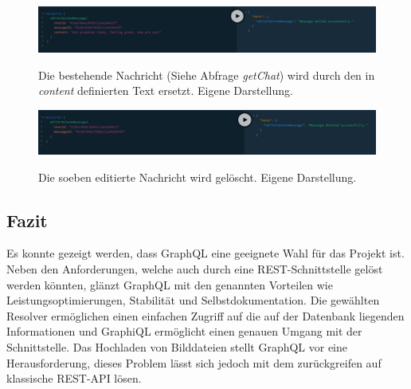 \begin{figure}
	\centering
    \includegraphics[width=\textwidth]{sources/graphiql_editMessage.png}\cite{}
	\caption{Die bestehende Nachricht (Siehe Abfrage \textit{getChat}) wird durch den in \textit{content} definierten Text ersetzt. Eigene Darstellung.}
	\label{fig:gql:8}
\end{figure}

\begin{figure}
	\centering
    \includegraphics[width=\textwidth]{sources/graphiql_deleteMessage.png}\cite{}
	\caption{Die soeben editierte Nachricht wird gelöscht. Eigene Darstellung.}
	\label{fig:gql:9}
\end{figure}

\subsection*{Fazit}
Es konnte gezeigt werden, dass GraphQL eine geeignete Wahl für das Projekt ist.
Neben den Anforderungen, welche auch durch eine REST-Schnittstelle gelöst werden könnten, glänzt GraphQL mit den genannten Vorteilen wie Leistungsoptimierungen, Stabilität und Selbstdokumentation.
Die gewählten Resolver ermöglichen einen einfachen Zugriff auf die auf der Datenbank liegenden Informationen und GraphiQL ermöglicht einen genauen Umgang mit der Schnittstelle.
Das Hochladen von Bilddateien stellt GraphQL vor eine Herausforderung, dieses Problem lässt sich jedoch mit dem zurückgreifen auf klassische REST-API lösen.
